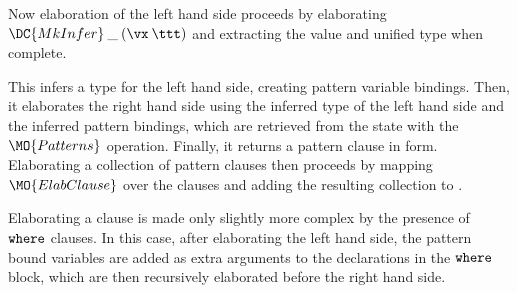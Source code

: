 
Now elaboration of the left hand side proceeds by elaborating $\DC{MkInfer}\:\_\:(\vx\:\ttt)$ and
extracting the value and unified type when complete.


This infers a type for the left hand side, creating pattern variable bindings. Then, 
it elaborates the right hand side using the inferred type of the left hand side
and the inferred pattern bindings, which are retrieved from the state with the
$\MO{Patterns}$ operation. Finally, it returns a pattern clause in \TT{} form.
Elaborating a collection of pattern clauses then proceeds by mapping $\MO{ElabClause}$ over
the clauses and adding the resulting collection to \TT{}.


Elaborating a clause is made only slightly more complex by the presence of
$\mathtt{where}$ clauses. In this case, after elaborating the left hand side, the pattern
bound variables are added as extra arguments to the declarations in the $\mathtt{where}$ block,
which are then recursively elaborated before the right hand side.


